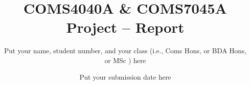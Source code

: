 

\title{COMS4040A \& COMS7045A Project -- Report}
\author{Put your name, student number, and your class (i.e., Coms Hons, or BDA Hons, or MSc ) here}
\date{Put your submission date here} 
\maketitle 
\pagestyle{fancy}
\fancyhf{}
\fancyhead[R]{\thepage}
\begingroup
  \let\clearpage\relax
  
\endgroup


\printbibliography
 



